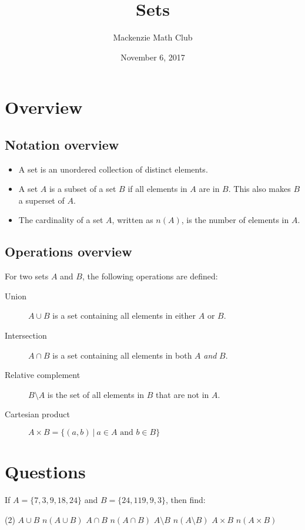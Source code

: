 \documentclass[letterpaper,12pt]{article}
\title{Sets}
\author{Mackenzie Math Club}
\date{November 6, 2017}
\newcommand{\such}{\ |\ }
\begin{document}
	\maketitle
	\section{Overview}
		\subsection{Notation overview}
			\begin{itemize}
				\item A set is an unordered collection of distinct elements.
				\item A set $A$ is a subset of a set $B$ if all elements in $A$ are in $B$. This also makes $B$ a superset of $A$.
				\item The cardinality of a set $A$, written as $n(A)$, is the number of elements in $A$.
			\end{itemize}
		\subsection{Operations overview}
			For two sets $A$ and $B$, the following operations are defined:
			\begin{description}
				\item[Union] $A \cup B$ is a set containing all elements in either $A$ or $B$.
				\item[Intersection] $A \cap B$ is a set containing all elements in both $A$ \emph{and} $B$.
				\item[Relative complement] $B \setminus A$ is the set of all elements in $B$ that are not in $A$.
				\item[Cartesian product] $A \times B = \{(a,b) \such a \in A \text{ and } b \in B\}$
			\end{description}
	\section{Questions}
		If $A = \{7,3,9,18,24\}$ and $B = \{24,119,9,3\}$, then find:
		\begin{tasks}[style=enumerate](2)
			\task $A \cup B$
			\task $n(A \cup B)$
			\task $A \cap B$
			\task $n(A \cap B)$
			\task $A \setminus B$
			\task $n(A \setminus B)$
			\task $A \times B$
			\task $n(A \times B)$
		\end{tasks}
\end{document}
